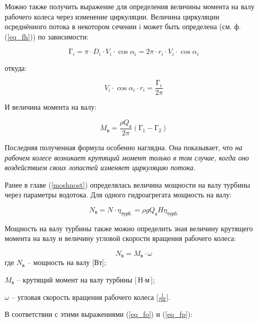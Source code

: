 Можно также получить выражение для определения величины момента на валу рабочего колеса через изменение циркуляции. Величина циркуляции осреднённого потока в некотором сечении i может быть определена (см. ф.(\ref{eq_fh})) по зависимости:

$$
   \text{Г}_i = \pi \cdot D_i \cdot V_i \cdot \cos \alpha_i = 2 \pi \cdot r_i \cdot V_i \cdot \cos \alpha_i
$$

откуда:

\begin{equation}
\label{eq_ft}
    V_i \cdot \cos \alpha_i \cdot r_i = \frac{\text{Г}_i}{2 \pi}
\end{equation}


И величина момента на валу:

$$
    M_{\text{в}} = \frac{\rho  Q_{\text{а}} }{2 \pi} (\text{Г}_1 - \text{Г}_2)
$$

Последняя полученная формула особенно наглядна. Она показывает, что {\color{red}\textit{на рабочем колесе возникает крутящий момент только в том случае, когда оно воздействием своих лопастей изменяет циркуляцию потока}}. 

\vspace{1 cm}

Ранее в главе (\ref{moshnost}) определялась величина мощности на валу турбины через параметры водотока. Для одного гидроагрегата мощность на валу:

\begin{equation}
\label{eq_fo}
    N_{\text{в}} = N \cdot \eta_{\text{турб.}} = \rho g Q_{\text{а}} H \eta_{\text{турб.}}
\end{equation}

Мощность на валу турбины также можно определить зная величину крутящего момента на валу и величину угловой скорости вращения рабочего колеса:

\begin{equation}
\label{eq_fp}
    N_{\text{в}} = M_{\text{в}} \cdot \omega
\end{equation}
где $ N_{\text{в}} $ -- мощность на валу [Вт];

$ M_{\text{в}} $ -- крутящий момент на валу турбины [$\text{Н} \cdot \text{м}$];

$ \omega $ -- угловая скорость вращения рабочего колеса [$ \frac{1}{\text{сек}} $].

\vspace{0.5 cm}

В соответствии с этими выражениями (\ref{eq_fo}) и (\ref{eq_fp}):

